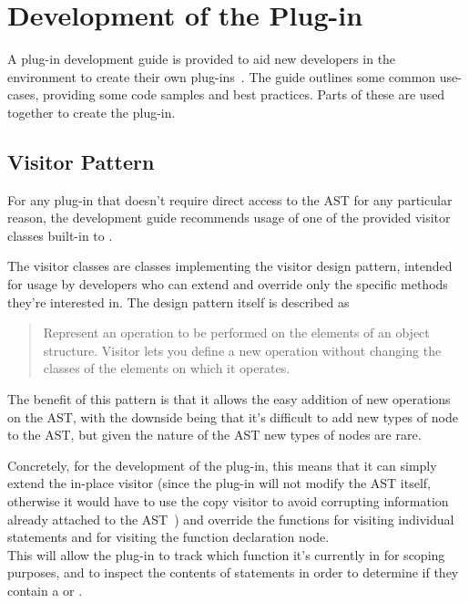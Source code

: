 \section{Development of the  Plug-in}

A plug-in development guide is provided to aid new developers in the  environment to create their own plug-ins~\cite{framaplug}. The guide outlines some common use-cases, providing some code samples and best practices. Parts of these are used together to create the  plug-in.

\subsection{Visitor Pattern}

For any plug-in that doesn't require direct access to the AST for any particular reason, the development guide recommends usage of one of the provided visitor classes built-in to .

The visitor classes are classes implementing the visitor design pattern, intended for usage by developers who can extend and override only the specific methods they're interested in. The design pattern itself is described as

\begin{quote}
	Represent an operation to be performed on the elements of an object structure. Visitor lets you define a new operation without changing the classes of the elements on which it operates.~\cite{gof}
\end{quote}

The benefit of this pattern is that it allows the easy addition of new operations on the AST, with the downside being that it's difficult to add new types of node to the AST, but given the nature of the AST new types of nodes are rare.

Concretely, for the development of the plug-in, this means that it can simply extend the in-place visitor (since the plug-in will not modify the AST itself, otherwise it would have to use the copy visitor to avoid corrupting information already attached to the AST~\cite{framaplug}) and override the functions for visiting individual statements and for visiting the function declaration node. \\
This will allow the plug-in to track which function it's currently in for scoping purposes, and to inspect the contents of statements in order to determine if they contain a \malloc{} or \free{}.

